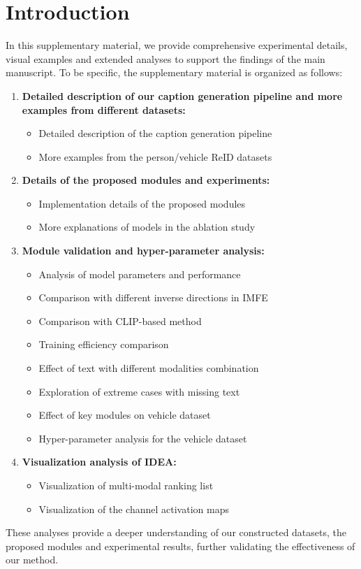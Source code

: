 \clearpage
\setcounter{page}{1}
\maketitlesupplementary
\section{Introduction}
In this supplementary material, we provide comprehensive experimental details, visual examples and extended analyses to support the findings of the main manuscript.
%
To be specific, the supplementary material is organized as follows:
%
\begin{enumerate}
\item \textbf{Detailed description of our caption generation pipeline and more examples from different datasets:}
\begin{itemize}
    \item Detailed description of the caption generation pipeline
    \item More examples from the person/vehicle ReID datasets
\end{itemize}
\item \textbf{Details of the proposed modules and experiments:}
\begin{itemize}
    \item Implementation details of the proposed modules
    \item More explanations of models in the ablation study
\end{itemize}
\item \textbf{Module validation and hyper-parameter analysis:}
\begin{itemize}
    \item Analysis of model parameters and performance
    \item Comparison with different inverse directions in IMFE
    \item Comparison with CLIP-based method
    \item Training efficiency comparison
    \item Effect of text with different modalities combination
    \item Exploration of extreme cases with missing text
    \item Effect of key modules on vehicle dataset
    \item Hyper-parameter analysis for the vehicle dataset
\end{itemize}
\item \textbf{Visualization analysis of IDEA:}
\begin{itemize}
    \item Visualization of multi-modal ranking list
    \item Visualization of the channel activation maps
\end{itemize}
\end{enumerate}
%
These analyses provide a deeper understanding of our constructed datasets, the proposed modules and experimental results, further validating the effectiveness of our method.
%
